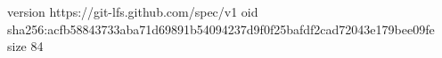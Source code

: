 version https://git-lfs.github.com/spec/v1
oid sha256:acfb58843733aba71d69891b54094237d9f0f25bafdf2cad72043e179bee09fe
size 84
